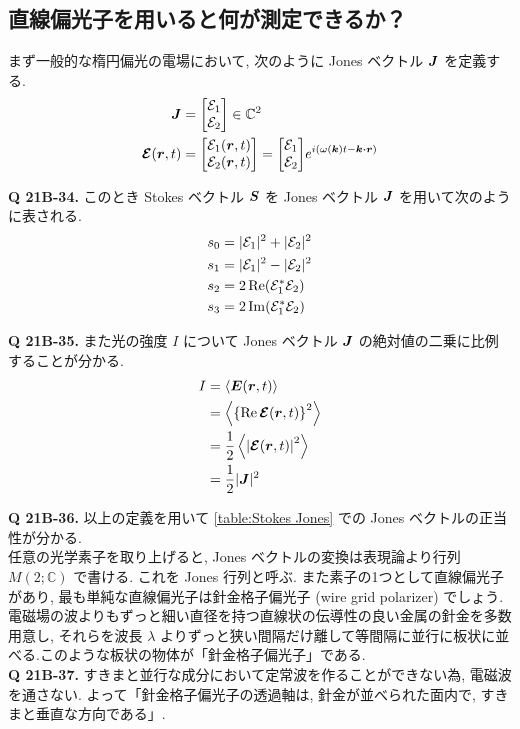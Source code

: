 \documentclass[uplatex,dvipdfmx,a4paper,11pt]{jlreq}
\newcommand{\CC}{\mathbb{C}}
\newcommand{\EE}{\bm{E}}
\newcommand{\rr}{\bm{r}}
\newcommand{\kk}{\bm{k}}
\theoremstyle{definition}
\begin{document}
\subsection{直線偏光子を用いると何が測定できるか？}
まず一般的な楕円偏光の電場において, 次のように Jones ベクトル $\bm{J}$ を定義する.
\begin{align}
  \JJ         & = \mqty[\Ec_1         \\ \Ec_2]\in\CC^2 \\
  \EC(\rr, t) & = \mqty[\Ec_1(\rr, t) \\ \Ec_2(\rr, t)] = \mqty[\Ec_1 \\ \Ec_2]e^{\ii(\omega(\kk)t - \kk\vdot\rr)}
\end{align}

\textbf{Q 21B-34.}
このとき Stokes ベクトル $\bm{S}$ を Jones ベクトル $\bm{J}$ を用いて次のように表される.
\begin{align}
  s_0 & = |\mathcal{E}_1|^2 + |\mathcal{E}_2|^2 \\
  s_1 & = |\mathcal{E}_1|^2 - |\mathcal{E}_2|^2 \\
  s_2 & = 2\Re(\mathcal{E}_1^*\mathcal{E}_2)    \\
  s_3 & = 2\Im(\mathcal{E}_1^*\mathcal{E}_2)
\end{align}

\textbf{Q 21B-35.}
また光の強度 $I$ について Jones ベクトル $\bm{J}$ の絶対値の二乗に比例することが分かる.
\begin{align}
  I & = \left\langle\EE(\rr, t)\right\rangle                   \\
    & = \left\langle\qty{\Re\EC(\rr,t)}^2\right\rangle         \\
    & = \frac{1}{2}\left\langle\qty|\EC(\rr,t)|^2\right\rangle \\
    & = \frac{1}{2}|\JJ|^2 \label{Jones strength}
\end{align}

\textbf{Q 21B-36.}
以上の定義を用いて \ref{table:Stokes Jones} での Jones ベクトルの正当性が分かる. \\

任意の光学素子を取り上げると, Jones ベクトルの変換は表現論より行列 $M(2; \CC)$ で書ける. これを Jones 行列と呼ぶ. また素子の1つとして直線偏光子があり, 最も単純な直線偏光子は針金格子偏光子 (wire grid polarizer) でしょう. 電磁場の波よりもずっと細い直径を持つ直線状の伝導性の良い金属の針金を多数用意し, それらを波長 $\lambda$ よりずっと狭い間隔だけ離して等間隔に並行に板状に並べる.このような板状の物体が「針金格子偏光子」である. \\

\textbf{Q 21B-37.}
すきまと並行な成分において定常波を作ることができない為, 電磁波を通さない. よって「針金格子偏光子の透過軸は, 針金が並べられた面内で, すきまと垂直な方向である」. \\
\end{document}
